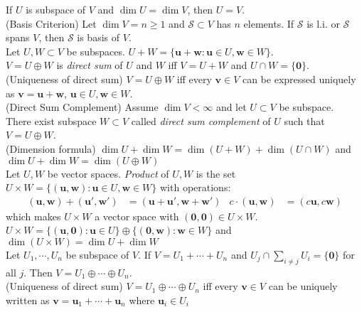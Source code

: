 \documentclass{article}
\theoremstyle{definition}
\begin{document}
If $U$ is subspace of $V$ and $\dim{U}=\dim{V}$, then $U=V$.\\
(Basis Criterion) Let $\dim{V}=n\geq 1$ and $\mathcal{S}\subset V$ has $n$ elements. If $\mathcal{S}$ is l.i. or $\mathcal{S}$ spans $V$, then $\mathcal{S}$ is basis of $V$.\\
Let $U,W\subset V$ be subspaces. $U+W=\{\mathbf{u}+\mathbf{w}:\mathbf{u}\in U,\mathbf{w}\in W\}$.\\
$V=U\oplus W$ is \textit{direct sum} of $U$ and $W$ iff $V=U+W$ and $U\cap W=\{\mathbf{0}\}$.\\
(Uniqueness of direct sum) $V=U\oplus W$ iff every $\mathbf{v}\in V$ can be expressed uniquely as $\mathbf{v}=\mathbf{u}+\mathbf{w}$, $\mathbf{u}\in U,\mathbf{w}\in W$.\\
(Direct Sum Complement) Assume $\dim{V}<\infty$ and let $U\subset V$ be subspace.\\
There exist subspace $W\subset V$ called \textit{direct sum complement} of $U$ such that $V=U\oplus W$.\\
(Dimension formula) $\dim{U}+\dim{W}=\dim(U+W)+\dim(U\cap W)$ and $\dim{U}+\dim{W}=\dim(U\oplus W)$\\
Let $U,W$ be vector spaces. \textit{Product} of $U,W$ is the set $U\times W=\{(\mathbf{u},\mathbf{w}):\mathbf{u}\in U,\mathbf{w}\in W\}$ with operations:
\begin{align*}
    (\mathbf{u},\mathbf{w})+(\mathbf{u}',\mathbf{w}')&=(\mathbf{u}+\mathbf{u}',\mathbf{w}+\mathbf{w}') & c\cdot(\mathbf{u},\mathbf{w})&=(c\mathbf{u},c\mathbf{w})
\end{align*}
which makes $U\times W$ a vector space with $(\mathbf{0},\mathbf{0})\in U\times W$.\\
$U\times W=\{(\mathbf{u},\mathbf{0}):\mathbf{u}\in U\}\oplus\{(\mathbf{0},\mathbf{w}):\mathbf{w}\in W\}$ and $\dim(U\times W)=\dim{U}+\dim{W}$\\
Let $U_{1},\cdots,U_{n}$ be subspace of $V$. If $V=U_{1}+\cdots+U_{n}$ and $U_{j}\cap\sum_{i\neq j}U_{i}=\{\mathbf{0}\}$ for all $j$. Then $V=U_{1}\oplus\cdots\oplus U_{n}$.\\
(Uniqueness of direct sum) $V=U_{1}\oplus\cdots\oplus U_{n}$ iff every $\mathbf{v}\in V$ can be uniquely written as $\mathbf{v}=\mathbf{u}_{1}+\cdots+\mathbf{u}_{n}$ where $\mathbf{u}_{i}\in U_{i}$
\newpage
\end{document}
